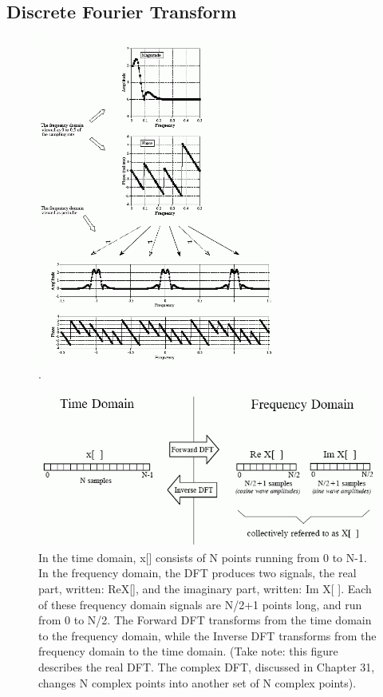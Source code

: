 \documentclass[a4paper,12pt]{article}
\begin{document}
\subsection{Discrete Fourier Transform}
\begin{figure}[ht]
  \label{fig:F_10_9}
  \centering
	\includegraphics[width=0.7\textwidth, keepaspectratio=true]{F_10_9}
	\caption{.}
\end{figure}


\begin{figure}[h!]
 \label{fig:F_8_3}
 \centering
 \includegraphics[width=\textwidth, keepaspectratio=true]{F_8_3}
 \caption{In the time domain, x[] consists of N points running from 0 to N-1. In the frequency domain,
the DFT produces two signals, the real part, written: ReX[], and the imaginary part, written: Im X[ ]. Each of
these frequency domain signals are N/2+1 points long, and run from 0 to N/2. The Forward DFT transforms from
the time domain to the frequency domain, while the Inverse DFT transforms from the frequency domain to the
time domain. (Take note: this figure describes the real DFT. The complex DFT, discussed in Chapter 31,
changes N complex points into another set of N complex points).}
\end{figure}
\end{document}
